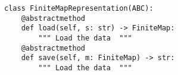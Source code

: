 \begin{verbatim}
class FiniteMapRepresentation(ABC):
    @abstractmethod
    def load(self, s: str) -> FiniteMap:
        """ Load the data  """
    @abstractmethod
    def save(self, m: FiniteMap) -> str:
        """ Load the data  """
\end{verbatim}